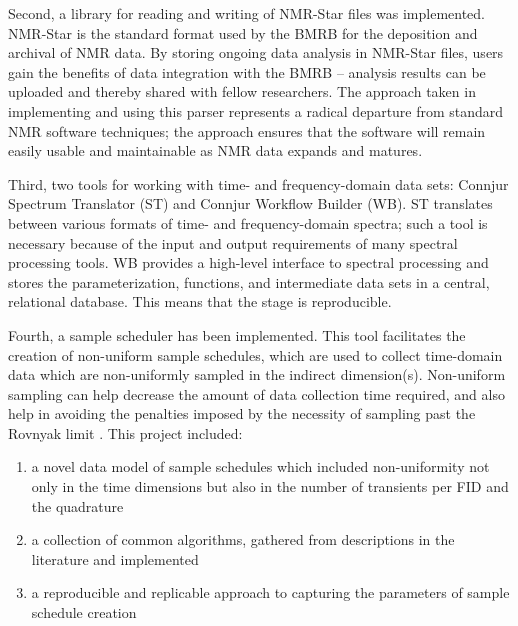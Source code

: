 Second, a library for reading and writing of NMR-Star files was implemented.  
NMR-Star is the standard format used by the BMRB for the deposition and 
archival of NMR data.  By storing ongoing data analysis in NMR-Star files, 
users gain the benefits of data integration with the BMRB -- analysis results 
can be uploaded and thereby shared with fellow researchers.  The approach 
taken in implementing and using this parser represents a radical departure 
from standard NMR software techniques; the approach ensures that the 
software will remain easily usable and maintainable as NMR data expands 
and matures.

Third, two tools for working with time- and frequency-domain data sets:  
Connjur Spectrum Translator (ST) and Connjur Workflow Builder (WB).  ST 
translates between various formats of time- and frequency-domain spectra; 
such a tool is necessary because of the input and output requirements of 
many spectral processing tools.  WB provides a high-level interface to 
spectral processing and stores the parameterization, functions, and 
intermediate data sets in a central, relational database.  This means 
that the stage is reproducible.

Fourth, a sample scheduler has been implemented.  This tool facilitates the 
creation of non-uniform sample schedules, which are used to collect time-domain 
data which are non-uniformly sampled in the indirect dimension(s).  Non-uniform 
sampling can help decrease the amount of data collection time required, and 
also help in avoiding the penalties imposed by the necessity of sampling past 
the Rovnyak limit \cite{rovnyak2004accelerated}.  This project included:
\begin{enumerate}
  \item a novel data model of sample schedules which included non-uniformity not 
only in the time dimensions but also in the number of transients per FID and 
the quadrature
  \item a collection of common algorithms, gathered from descriptions in the 
literature and implemented
  \item a reproducible and replicable approach to capturing the parameters of 
sample schedule creation
\end{enumerate}


